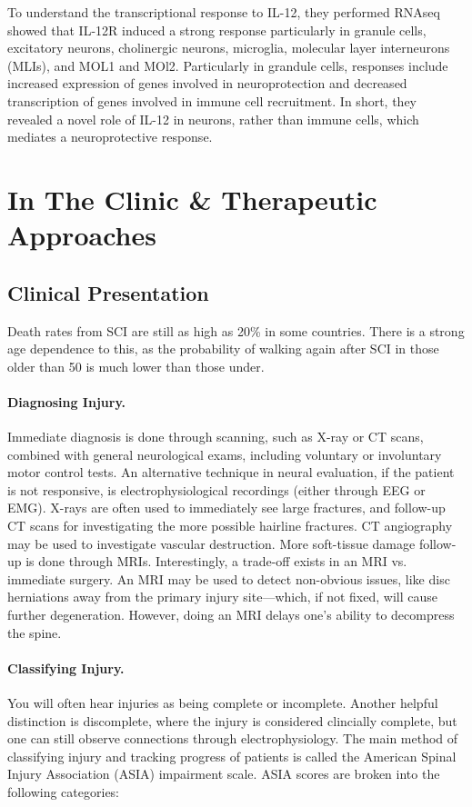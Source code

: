 To understand the transcriptional response to IL-12, they performed RNAseq showed that IL-12R induced a strong response particularly in granule cells, excitatory neurons, cholinergic neurons, microglia, molecular layer interneurons (MLIs), and MOL1 and MOl2. Particularly in grandule cells, responses include increased expression of genes involved in neuroprotection and decreased transcription of genes involved in immune cell recruitment. In short, they revealed a novel role of IL-12 in neurons, rather than immune cells, which mediates a neuroprotective response. 



\chapter{In The Clinic \& Therapeutic Approaches}


\section{Clinical Presentation}
Death rates from SCI are still as high as 20\% in some countries. There is a strong age dependence to this, as the probability of walking again after SCI in those older than 50 is much lower than those under.

\subsubsection{Diagnosing Injury.}
Immediate diagnosis is done through scanning, such as X-ray or CT scans, combined with general neurological exams, including voluntary or involuntary motor control tests. An alternative technique in neural evaluation, if the patient is not responsive, is electrophysiological recordings (either through EEG or EMG). X-rays are often used to immediately see large fractures, and follow-up CT scans for investigating the more possible hairline fractures. CT angiography may be used to investigate vascular destruction. More soft-tissue damage follow-up is done through MRIs. Interestingly, a trade-off exists in an MRI vs. immediate surgery. An MRI may be used to detect non-obvious issues, like disc herniations away from the primary injury site---which, if not fixed, will cause further degeneration. However, doing an MRI delays one's ability to decompress the spine.\newline


\subsubsection{Classifying Injury.}
You will often hear injuries as being complete or incomplete. Another helpful distinction is discomplete, where the injury is considered clincially complete, but one can still observe connections through electrophysiology. The main method of classifying injury and tracking progress of patients is called the American Spinal Injury Association (ASIA) impairment scale. ASIA scores are broken into the following categories: 

